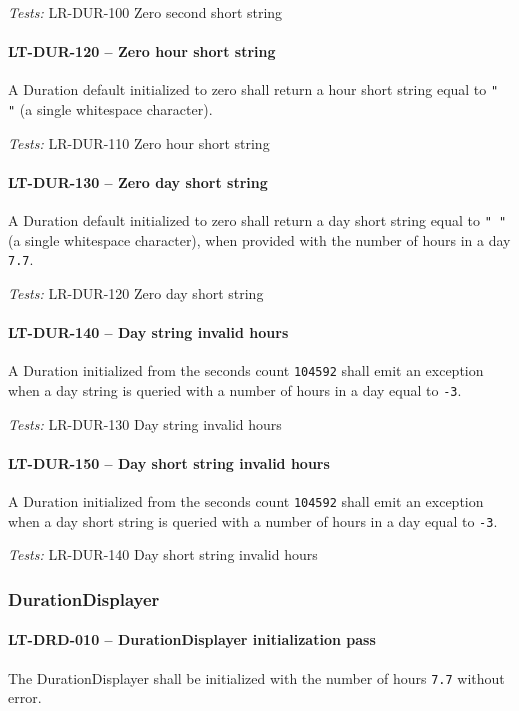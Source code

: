 \textit{Tests: } LR-DUR-100 Zero second short string

\paragraph{LT-DUR-120 -- Zero hour short string}
A Duration default initialized to zero shall return a hour short
string equal to \lstinline{" "} (a single whitespace character).

\textit{Tests: } LR-DUR-110 Zero hour short string

\paragraph{LT-DUR-130 -- Zero day short string}
A Duration default initialized to zero shall return a day short
string equal to \lstinline{" "} (a single whitespace character),
when provided with the number of hours in a day \lstinline{7.7}.

\textit{Tests: } LR-DUR-120 Zero day short string

\paragraph{LT-DUR-140 -- Day string invalid hours}
A Duration initialized from the seconds count \lstinline{104592}
shall emit an exception when a day string is queried with a
number of hours in a day equal to \lstinline{-3}.

\textit{Tests: } LR-DUR-130 Day string invalid hours

\paragraph{LT-DUR-150 -- Day short string invalid hours}
A Duration initialized from the seconds count \lstinline{104592}
shall emit an exception when a day short string is queried with a
number of hours in a day equal to \lstinline{-3}.

\textit{Tests: } LR-DUR-140 Day short string invalid hours

\subsubsection{DurationDisplayer}
\paragraph{LT-DRD-010 -- DurationDisplayer initialization pass}
The DurationDisplayer shall be initialized with the number of hours
\lstinline{7.7} without error.

